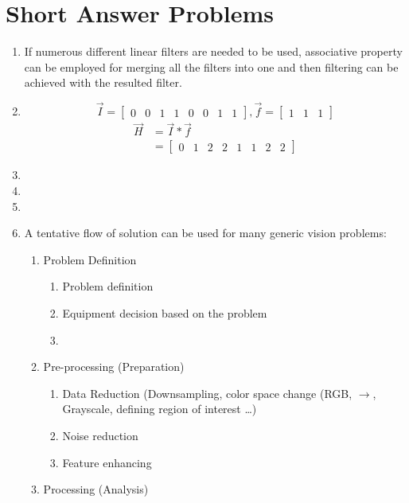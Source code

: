 \documentclass{article}
\begin{document}
\section{Short Answer Problems}
\begin{enumerate}
	\item If numerous different linear filters are needed to be used, associative
	property can be employed for merging all the filters into one and then
	filtering can be achieved with the resulted filter.
	\item 
	$$\vec{I} = \begin{bmatrix} 0 & 0 & 1 & 1 & 0 & 0 & 1 & 1\end{bmatrix}
	, \vec{f}= \begin{bmatrix} 1 & 1 & 1\end{bmatrix}$$
	\begin{equation} 
	\begin{split}
	\vec{H} & = \vec{I} \ast \vec{f} \\
	& = \begin{bmatrix} 0 & 1 & 2 & 2 & 1 & 1 & 2 & 2 \end{bmatrix}
	\end{split}
	\end{equation}
	\item
	\item
	\item
	\item A tentative flow of solution can be used for many generic vision
	problems:
	\begin{enumerate}
		\item Problem Definition
		\begin{enumerate}
			\item Problem definition
			\item Equipment decision based on the problem
			\item 
		\end{enumerate}
		\item Pre-processing (Preparation)
		\begin{enumerate}
			\item Data Reduction (Downsampling, color space change (RGB, $\to$,
			Grayscale, defining region of interest \ldots)
			\item Noise reduction
			\item Feature enhancing 
		\end{enumerate}
		\item Processing (Analysis)
		\begin{enumerate}

\end{enumerate}
\end{enumerate}
\end{enumerate}
\end{document}
